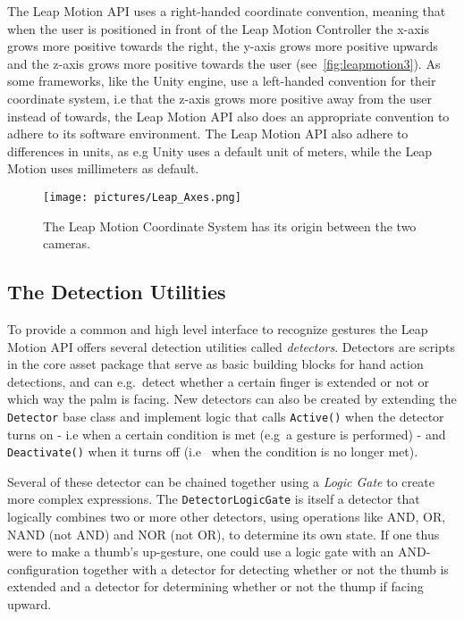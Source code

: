 The Leap Motion API uses a right-handed coordinate convention, meaning that when the user is positioned in front of the Leap Motion Controller the x-axis grows more positive 
towards the right, the y-axis grows more positive upwards and the z-axis grows more positive towards the user (see~\vref{fig:leapmotion3}). 
As some frameworks, like the Unity engine, use a left-handed convention for their coordinate system, i.e that the z-axis grows more positive away from the 
user instead of towards, the Leap Motion API also does an appropriate convention to adhere to its software environment. 
The Leap Motion API also adhere to differences in units, as e.g Unity uses a default unit of meters, while the Leap Motion uses millimeters as default.

\begin{figure}%
	\texttt{[image: pictures/Leap\_Axes.png]}
	\caption[Leap Motion Coordinates]{The Leap Motion Coordinate System has its origin between the two cameras.}
	\label{fig:leapmotion3}
\end{figure} 

\subsection{The Detection Utilities}
To provide a common and high level interface to recognize gestures the Leap Motion API offers several detection utilities called \textit{detectors}.
Detectors are scripts in the core asset package that serve as basic building blocks for hand action detections, and can e.g.~detect whether a certain finger is extended or not
or which way the palm is facing. New detectors can also be created by extending
the \texttt{Detector} base class and implement logic that calls \texttt{Active()} when the detector turns on - i.e when a certain condition is met (e.g~a gesture is performed) - 
and \texttt{Deactivate()} when it turns off (i.e~ when the condition is no longer met).

Several of these detector can be chained together using a \textit{Logic Gate} to create more complex expressions. 
The \texttt{DetectorLogicGate} is itself a detector that logically combines two or more other detectors, using operations like AND, OR, NAND (not AND) and NOR (not OR), 
to determine its own state.
If one thus were to make a thumb's up-gesture, one could use a logic gate with an AND-configuration together with a detector for detecting whether or not the
thumb is extended and a detector for determining whether or not the thump if facing upward. 

